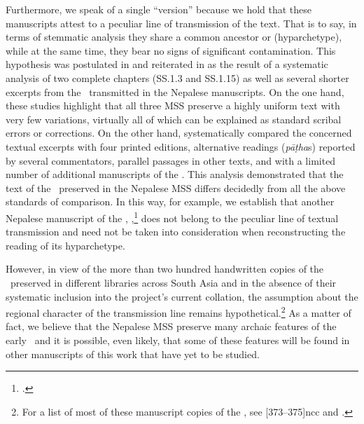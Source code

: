 Furthermore, we speak of a single “version” because we hold that these manuscripts
attest to a peculiar line of transmission of the text.  That is to say, in terms of
stemmatic analysis they share %
a common ancestor or (hyparchetype), while at the same time, they
bear no signs of significant contamination.  This hypothesis was postulated in
\citet{kleb-2010} and reiterated in \citet{kleb-2021a} as the result of a
systematic analysis of two complete chapters (SS.1.3 and SS.1.15) %
as well as several shorter excerpts from the \SS\ transmitted in the Nepalese
manuscripts. On the one hand, these studies highlight that all three MSS preserve
a highly uniform text with very few variations, virtually all of which can be
explained as standard scribal errors or corrections. On the other hand,
\citet{kleb-2010,kleb-2021a} systematically compared %
the concerned textual excerpts with four printed editions, alternative readings
(\emph{pāṭha}s) reported by several commentators, %
parallel passages in other texts, and with a limited number of additional
manuscripts of the \SS. This analysis demonstrated that the text of the \SS\
preserved in the Nepalese MSS differs decidedly from all the above standards of
comparison. In this way, for example, we establish that another Nepalese
manuscript of the \SS, \MS{Kathmandu NAK 1-1146},\footcite{rima-2022} does not
belong to the peculiar line of textual transmission and need not be taken into
consideration when reconstructing the reading of its hyparchetype. 

However, in view of the more than two hundred handwritten copies of the \SS\ preserved
in different libraries across South Asia and in the absence of their systematic
inclusion into the project's current collation, 
the assumption about the regional character of the transmission line remains
hypothetical.\footnote{For a list of most of these manuscript copies of the \SS, see
     \volcite{39}[373--375]{ncc} and \cite{wuja-2020}.} 
    As a matter of fact, we believe that the Nepalese MSS
preserve many archaic features of the early \SS\ and it is possible, even likely, that
some of these features will be found in other manuscripts of this work that have
yet to be studied.%

